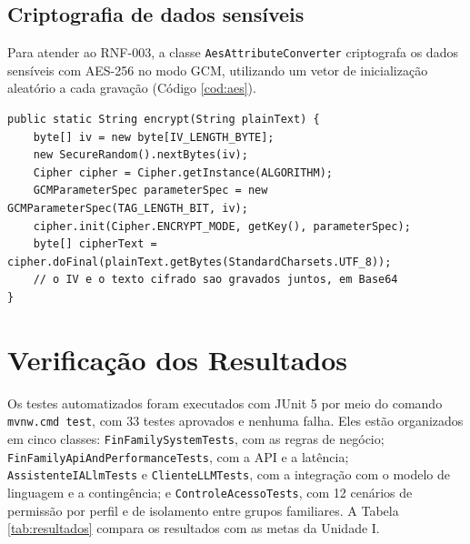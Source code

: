 \documentclass[12pt,oneside,a4paper,article]{abntex2}
\begin{document}
\subsection{Criptografia de dados sensíveis}

Para atender ao RNF-003, a classe \texttt{AesAttributeConverter} criptografa os dados sensíveis com AES-256 no modo GCM, utilizando um vetor de inicialização aleatório a cada gravação (Código \ref{cod:aes}).

\begin{lstlisting}[caption={Criptografia AES-256-GCM (AesAttributeConverter.java)},label={cod:aes}]
public static String encrypt(String plainText) {
    byte[] iv = new byte[IV_LENGTH_BYTE];
    new SecureRandom().nextBytes(iv);
    Cipher cipher = Cipher.getInstance(ALGORITHM);
    GCMParameterSpec parameterSpec = new GCMParameterSpec(TAG_LENGTH_BIT, iv);
    cipher.init(Cipher.ENCRYPT_MODE, getKey(), parameterSpec);
    byte[] cipherText = cipher.doFinal(plainText.getBytes(StandardCharsets.UTF_8));
    // o IV e o texto cifrado sao gravados juntos, em Base64
}
\end{lstlisting}

\section{Verificação dos Resultados}
\label{sec:validacao}

Os testes automatizados foram executados com JUnit 5 por meio do comando \texttt{mvnw.cmd test}, com 33 testes aprovados e nenhuma falha. Eles estão organizados em cinco classes: \texttt{FinFamilySystemTests}, com as regras de negócio; \texttt{FinFamilyApiAndPerformanceTests}, com a API e a latência; \texttt{AssistenteIALlmTests} e \texttt{ClienteLLMTests}, com a integração com o modelo de linguagem e a contingência; e \texttt{ControleAcessoTests}, com 12 cenários de permissão por perfil e de isolamento entre grupos familiares. A Tabela \ref{tab:resultados} compara os resultados com as metas da Unidade I.
\end{document}
